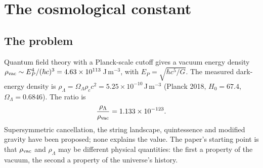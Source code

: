 \providecommand{\authorhold}[1]{\par\smallskip\noindent\fbox{\parbox{0.95\linewidth}{\small\textbf{Author hold.} #1}}\par\smallskip}
\chapter{The cosmological constant}\label{ch:lambda}

\section{The problem}
Quantum field theory with a Planck-scale cutoff gives a vacuum energy density $\rho_{\rm vac}\sim E_P^4/(\hbar c)^3=4.63\times10^{113}$\,J\,m$^{-3}$,
with $E_P=\sqrt{\hbar c^5/G}$. The measured dark-energy density is $\rho_\Lambda=\Omega_\Lambda\rho_c c^2=5.25\times10^{-10}$\,J\,m$^{-3}$
(Planck 2018, $H_0=67.4$, $\Omega_\Lambda=0.6846$). The ratio is
\begin{equation}\frac{\rho_\Lambda}{\rho_{\rm vac}}=1.133\times10^{-123}.\end{equation}
Supersymmetric cancellation, the string landscape, quintessence and modified gravity have been proposed; none explains the value. The paper's
starting point is that $\rho_{\rm vac}$ and $\rho_\Lambda$ may be different physical quantities: the first a property of the vacuum, the second a
property of the universe's history.

